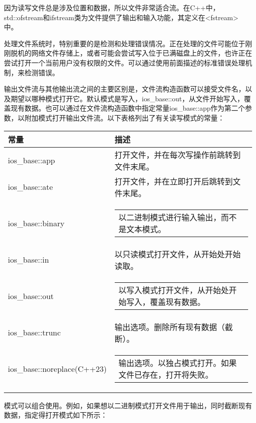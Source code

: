 
因为读写文件总是涉及位置和数据，所以文件非常适合流。在C++中，std::ofstream和ifstream类为文件提供了输出和输入功能，其定义在<fstream>中。

处理文件系统时，特别重要的是检测和处理错误情况。正在处理的文件可能位于刚刚脱机的网络文件存储上，或者可能会尝试写入位于已满磁盘上的文件，也许正在尝试打开一个当前用户没有权限的文件。可以通过使用前面描述的标准错误处理机制，来检测错误。

输出文件流与其他输出流之间的主要区别是，文件流构造函数可以接受文件名，以及期望以哪种模式打开它。默认模式是写入，ios\_base::out，从文件开始写入，覆盖现有数据。也可以通过在文件流构造函数中指定常量ios\_base::app作为第二个参数，以附加模式打开输出文件流。以下表格列出了有关读写模式的常量：


\begin{longtable}{|l|l|}
\hline
\textbf{常量} & \textbf{描述}                                    \\ \hline
\endfirsthead
%
\endhead
%
ios\_base::app    & 打开文件，并在每次写操作前跳转到文件末尾。
    \\ \hline
ios\_base::ate    & 打开文件，并在立即打开后跳转到文件末尾。
 \\ \hline
ios\_base::binary           & \begin{tabular}[c]{@{}l@{}}以二进制模式进行输入输出，而不是文本模式。
\end{tabular} \\ \hline
ios\_base::in     & 以只读模式打开文件，从开始处开始读取。
         \\ \hline
ios\_base::out              & \begin{tabular}[c]{@{}l@{}}以写入模式打开文件，从开始处开始写入，覆盖现有数据。
\end{tabular}            \\ \hline
ios\_base::trunc  & 输出选项。删除所有现有数据（截断）。
    \\ \hline
ios\_base::noreplace(C++23) & \begin{tabular}[c]{@{}l@{}}输出选项。以独占模式打开。如果文件已存在，打开将失败。
\end{tabular}     \\ \hline
\end{longtable}

模式可以组合使用。例如，如果想以二进制模式打开文件用于输出，同时截断现有数据，指定得打开模式如下所示：

